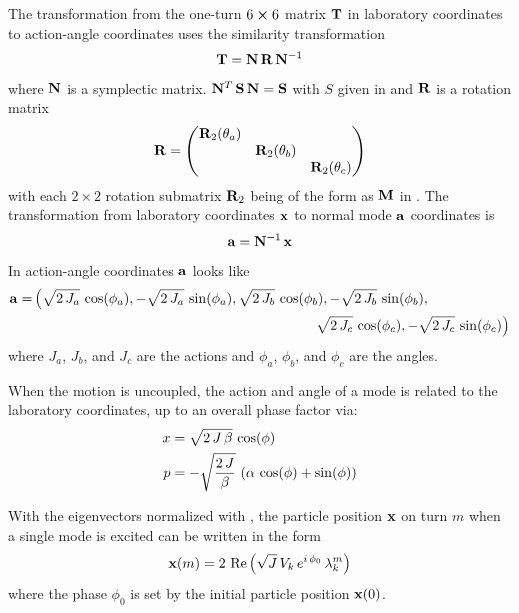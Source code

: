 The transformation from the one-turn $6 \mathbin{\boldsymbol{\times}} 6$ matrix ${\bf T}$ in laboratory coordinates to
action-angle coordinates uses the similarity transformation
\begin{equation}
  {\bf T} = {\bf N} \, {\bf R} \, {\bf N}^{-1}
\end{equation}
where ${\bf N}$ is a symplectic matrix. ${\bf N}^T \, {\bf S} \, {\bf N} = {\bf S}$ with $S$ given in 
and ${\bf R}$ is a rotation matrix
\begin{equation}
  {\bf R} = \begin{pmatrix}
    {\bf R}_2(\theta_a) &                  &                  \\
                     & {\bf R}_2(\theta_b) &                  \\
                     &                  & {\bf R}_2(\theta_c)
  \end{pmatrix}
\end{equation}
with each $2 \times 2$ rotation submatrix ${\bf R}_2$ being of the form as ${\bf M}$ in .
The transformation from laboratory coordinates ${\bf x}$ to normal mode ${\bf a}$ coordinates is
\begin{equation}
  {\bf a} = {\bf N}^{-1} \, {\bf x}
\end{equation}
In action-angle coordinates ${\bf a}$ looks like
\begin{align}
  \bfa = &\left( \sqrt{2 \, J_a} \, \cos(\phi_a), -\sqrt{2 \, J_a} \, \sin(\phi_a), 
                 \sqrt{2 \, J_b} \, \cos(\phi_b), -\sqrt{2 \, J_b} \, \sin(\phi_b), \right. \\
        &\hskip20em \left. 
                 \sqrt{2 \, J_c} \, \cos(\phi_c), -\sqrt{2 \, J_c} \, \sin(\phi_c) 
         \right) \nonumber
\end{align}
where $J_a$, $J_b$, and $J_c$ are the actions and $\phi_a$, $\phi_b$, and $\phi_c$ are the angles.

When the motion is uncoupled, the action and angle of a mode is related to the laboratory coordinates, up
to an overall phase factor via:
\begin{align}
  x &= \sqrt{2 \, J \, \beta} \, \cos( \phi ) \nonumber \\
  p &= -\sqrt{\frac{2 \, J}{\beta}} \, \left( \alpha \, \cos( \phi ) + \sin( \phi ) \right) \nonumber \\
\end{align}

With the eigenvectors normalized with , the particle position ${\bf x}$ on turn $m$ when a
single mode is excited can be written in the form
\begin{equation}
  {\bf x}(m) = 2 \, \operatorname{Re} \left( \sqrt{J} \, V_k \, e^{i \, \phi_0} \, \lambda_k^m \right)
  \label{x2jv}
\end{equation}
where the phase $\phi_0$ is set by the initial particle position ${\bf x}(0)$.


